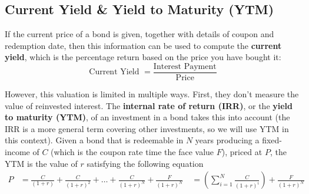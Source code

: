 \documentclass{article}
\begin{document}
  \subsection{Current Yield \& Yield to Maturity (YTM)}

    If the current price of a bond is given, together with details of coupon and redemption date, then this information can be used to compute the \textbf{current yield}, which is the percentage return based on the price you have bought it:
    \begin{equation}
      \text{Current Yield } = \frac{\text{Interest Payment}}{\text{Price}}
    \end{equation}

    However, this valuation is limited in multiple ways. First, they don't measure the value of reinvested interest. The \textbf{internal rate of return (IRR)}, or the \textbf{yield to maturity (YTM)}, of an investment in a bond takes this into account (the IRR is a more general term covering other investments, so we will use YTM in this context). Given a bond that is redeemable in $N$ years producing a fixed-income of $C$ (which is the coupon rate time the face value $F$), priced at $P$, the YTM is the value of $r$ satisfying the following equation
    \begin{align*}
      P & = \frac{C}{(1+r)} + \frac{C}{(1+r)^2} + \ldots + \frac{C}{(1+r)^{N}} + \frac{F}{(1+r)^N} \
      & = \left(\sum_{i=1}^N \frac{C}{(1+r)^i} \right) + \frac{F}{(1+r)^N}
    \end{align*}
\end{document}
